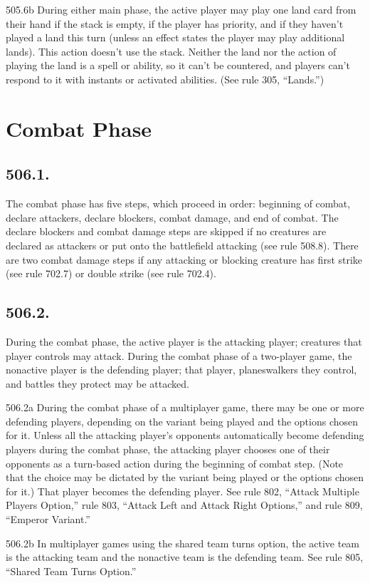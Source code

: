 505.6b During either main phase, the active player may play one land card from their hand if the stack is empty, if the player has priority, and if they haven’t played a land this turn (unless an effect states the player may play additional lands). This action doesn’t use the stack. Neither the land nor the action of playing the land is a spell or ability, so it can’t be countered, and players can’t respond to it with instants or activated abilities. (See rule 305, “Lands.”)

\section{Combat Phase}
\subsection*{506.1.}
The combat phase has five steps, which proceed in order: beginning of combat, declare attackers, declare blockers, combat damage, and end of combat. The declare blockers and combat damage steps are skipped if no creatures are declared as attackers or put onto the battlefield attacking (see rule 508.8). There are two combat damage steps if any attacking or blocking creature has first strike (see rule 702.7) or double strike (see rule 702.4).

\subsection*{506.2.}
During the combat phase, the active player is the attacking player; creatures that player controls may attack. During the combat phase of a two-player game, the nonactive player is the defending player; that player, planeswalkers they control, and battles they protect may be attacked.

506.2a During the combat phase of a multiplayer game, there may be one or more defending players, depending on the variant being played and the options chosen for it. Unless all the attacking player’s opponents automatically become defending players during the combat phase, the attacking player chooses one of their opponents as a turn-based action during the beginning of combat step. (Note that the choice may be dictated by the variant being played or the options chosen for it.) That player becomes the defending player. See rule 802, “Attack Multiple Players Option,” rule 803, “Attack Left and Attack Right Options,” and rule 809, “Emperor Variant.”

506.2b In multiplayer games using the shared team turns option, the active team is the attacking team and the nonactive team is the defending team. See rule 805, “Shared Team Turns Option.”

